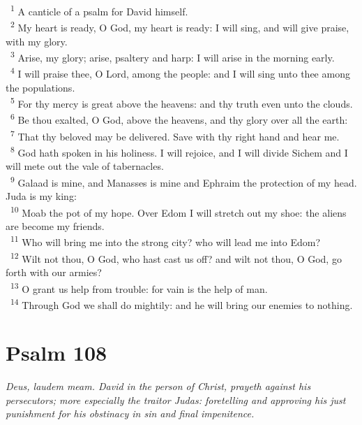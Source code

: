 \documentclass[a5paper,12pt]{article}
\begin{document}
\begin{multicols*}{2}
~\textsuperscript{1} A canticle of a psalm for David himself.\\
~\textsuperscript{2} My heart is ready, O God, my heart is ready: I will sing, and will give praise, with my glory.\\
~\textsuperscript{3} Arise, my glory; arise, psaltery and harp: I will arise in the morning early.\\
~\textsuperscript{4} I will praise thee, O Lord, among the people: and I will sing unto thee among the populations.\\
~\textsuperscript{5} For thy mercy is great above the heavens: and thy truth even unto the clouds.\\
~\textsuperscript{6} Be thou exalted, O God, above the heavens, and thy glory over all the earth:\\
~\textsuperscript{7} That thy beloved may be delivered. Save with thy right hand and hear me.\\
~\textsuperscript{8} God hath spoken in his holiness. I will rejoice, and I will divide Sichem and I will mete out the vale of tabernacles.\\
~\textsuperscript{9} Galaad is mine, and Manasses is mine and Ephraim the protection of my head. Juda is my king:\\
~\textsuperscript{10} Moab the pot of my hope. Over Edom I will stretch out my shoe: the aliens are become my friends.\\
~\textsuperscript{11} Who will bring me into the strong city? who will lead me into Edom?\\
~\textsuperscript{12} Wilt not thou, O God, who hast cast us off? and wilt not thou, O God, go forth with our armies?\\
~\textsuperscript{13} O grant us help from trouble: for vain is the help of man.\\
~\textsuperscript{14} Through God we shall do mightily: and he will bring our enemies to nothing.\\

\section{Psalm 108}
\label{sec:orgbc64484}
\emph{Deus, laudem meam. David in the person of Christ, prayeth against his persecutors; more especially the traitor Judas: foretelling and approving his just punishment for his obstinacy in sin and final impenitence.}\\


\end{multicols*}
\end{document}
